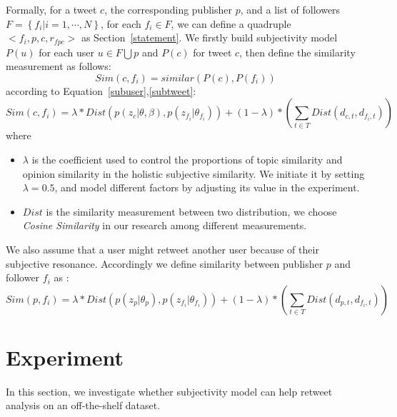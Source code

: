 \documentclass[smallcondensed]{svjour3}     %
\begin{document}
Formally, for a tweet $ c $, the corresponding publisher $ p $, and a list of followers $ F= \left\lbrace f_{i} \vert i=1, \cdots, N \right\rbrace  $, for each $ f_{i} \in F $, we can define a quadruple $ < f_{i}, p, c, r_{fpc} >  $ as Section~\ref{statement}.
We firstly build subjectivity model  $ P\left( u \right)  $ for each user $ u \in F \bigcup p $ and $ P\left( c \right)  $ for tweet $ c $, then define the similarity measurement as follows:
\begin{equation}
Sim\left( c,f_{i} \right) = similar\left( P\left( c \right), P\left( f_{i} \right) \right)
\end{equation}
according to Equation~\ref{subuser},\ref{subtweet}:
\begin{equation}
\label{tweetfollower}
Sim\left( c,f_{i} \right) = \lambda \ast Dist\left( p\left( z_{c} \vert \theta, \beta \right), p\left( z_{f_{i}} \vert \theta_{f_{i}} \right) \right) 
+\left(1-\lambda \right) \ast \left( \sum_{t \in T} Dist \left( d_{c,t}, d_{f_{i}, t} \right)  \right)
\end{equation}
where 
\begin{itemize}
\item $ \lambda $ is the coefficient used to control the proportions of topic similarity and opinion similarity in the holistic subjective similarity. We initiate it by setting $ \lambda =0.5 $, and model different factors by adjusting its value in the experiment. 
\item $ Dist $ is the similarity measurement between two distribution, we choose \emph{Cosine Similarity } in our research among different measurements.
\end{itemize}
We also assume that a user might retweet another user because of their subjective resonance. Accordingly we define similarity between publisher $ p $ and follower $ f_{i} $ as :
\begin{equation}
\label{pubfollower}
Sim\left( p,f_{i} \right) = \lambda \ast Dist\left( p\left( z_{p} \vert \theta_{p} \right), p\left( z_{f_{i}} \vert \theta_{f_{i}} \right) \right)+\left(1-\lambda \right) \ast \left( \sum_{t \in T} Dist \left( d_{p,t}, d_{f_{i}, t} \right)  \right)
\end{equation}

\section{Experiment}
\label{experiment}
In this section, we investigate whether subjectivity model  can help retweet analysis on an off-the-shelf dataset. 
\end{document}
